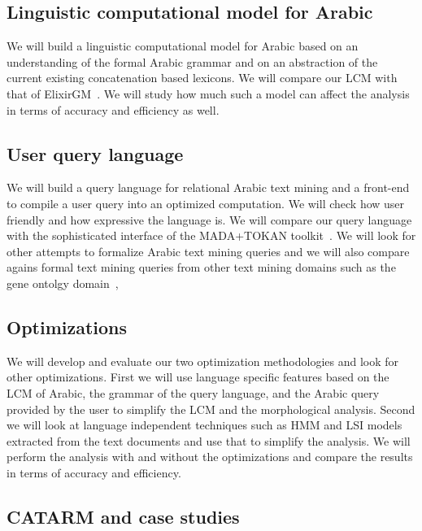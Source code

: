 \documentclass[12pt]{article}
\begin{document}
\subsection{Linguistic computational model for Arabic}

We will build a linguistic computational model for Arabic 
based on an understanding of the formal Arabic grammar 
and on an abstraction of the current existing concatenation
based lexicons.
We will compare our LCM with that of ElixirGM~\cite{Otakar:07}.
We will study how much such a model can affect the analysis
in terms of accuracy and efficiency as well. 

\subsection{User query language}

We will build a query language for relational Arabic text mining 
and a front-end to compile a user query into an optimized
computation. 
We will check how user friendly and how expressive the language is.
We will compare our query language with the sophisticated 
interface of the MADA+TOKAN toolkit~\cite{Habash:09}.
We will look for other attempts to formalize Arabic text 
mining queries and we will also compare agains 
formal text mining queries from other text mining domains such
as the gene ontolgy domain~\cite{GeneOntology10},

\subsection{Optimizations}

We will develop and evaluate our two optimization methodologies
and look for other optimizations. 
First we will use language specific features based on the 
LCM of Arabic, the grammar of the query language, and 
the Arabic query provided by the user to simplify 
the LCM and the morphological analysis. 
Second we will look at language independent techniques
such as HMM and LSI models extracted from the 
text documents and use that to simplify the analysis. 
We will perform the analysis with and without the optimizations
and compare the results in terms of accuracy and efficiency. 

\subsection{CATARM and case studies }
\end{document}
